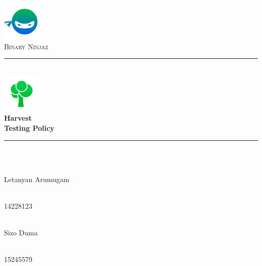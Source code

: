 \documentclass[12pt]{article}
\begin{document}
\begin{titlepage}

	\begin{center}
		\includegraphics[height=5em]{images/Bin.png}\\
		\textsc{\LARGE Binary Ninjaz}\\[0.3cm]
		\rule{\linewidth}{0.5mm} \\[0.5cm]
		\includegraphics[height=5em]{images/Icon.png}\\
		{ \huge \bfseries Harvest \\
		  \vspace{0.3cm}\large \bfseries Testing Policy}\\[0.5cm]
		\rule{\linewidth}{0.5mm} \\[1cm]


		\begin{minipage}{0.4\textwidth}
			\begin{flushleft} \large
				\emph{} \\
				Letanyan {Arumugam}
			\end{flushleft}
		\end{minipage}
		\begin{minipage}{0.4\textwidth}
			\begin{flushright} \large
				\emph{} \\
				14228123
			\end{flushright}
		\end{minipage}

		\begin{minipage}{0.4\textwidth}
			\begin{flushleft} \large
            	\emph{} \\
				Sizo {Duma}
			\end{flushleft}
		\end{minipage}
		\begin{minipage}{0.4\textwidth}
			\begin{flushright} \large
				\emph{} \\
				15245579
			\end{flushright}
		\end{minipage}


\end{center}
\end{titlepage}
\end{document}
